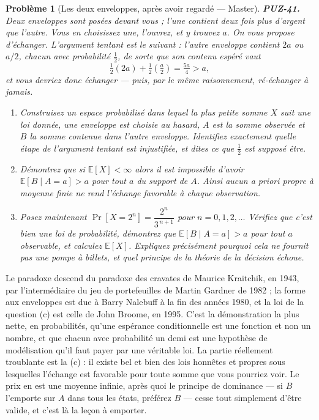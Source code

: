 \documentclass[11pt]{article}
\newtheorem{problem}{Problème}
\begin{document}
\begin{problem}[{Les deux enveloppes, après avoir regardé --- Master}]
\textbf{PUZ-41.} Deux enveloppes sont posées devant vous ; l'une contient deux fois plus
d'argent que l'autre. Vous en choisissez une, l'ouvrez, et y trouvez $ a $. On vous propose
d'échanger. L'argument tentant est le suivant : l'autre enveloppe contient $ 2a $ ou
$ a/2 $, chacun avec probabilité $ \tfrac{1}{2} $, de sorte que son contenu espéré vaut
\[ \tfrac{1}{2}(2a) + \tfrac{1}{2}\!\left(\tfrac{a}{2}\right) = \tfrac{5a}{4} > a, \]
et vous devriez donc échanger --- puis, par le même raisonnement, ré-échanger à jamais.
\begin{enumerate}
\item[(a)] Construisez un espace probabilisé dans lequel la plus petite somme $ X $ suit une loi
donnée, une enveloppe est choisie au hasard, $ A $ est la somme observée et $ B $ la
somme contenue dans l'autre enveloppe. Identifiez exactement quelle étape de l'argument
tentant est injustifiée, et dites ce que $ \tfrac{1}{2} $ est supposé être.
\item[(b)] Démontrez que si $ \mathbb{E}[X] < \infty $ alors il est impossible d'avoir
$ \mathbb{E}[B \mid A = a] > a $ pour tout $ a $ du support de $ A $. Ainsi aucun a
priori propre à moyenne finie ne rend l'échange favorable à chaque observation.
\item[(c)] Posez maintenant $ \Pr[X = 2^{n}] = \dfrac{2^{n}}{3^{\,n+1}} $ pour
$ n = 0, 1, 2, \ldots $ Vérifiez que c'est bien une loi de probabilité, démontrez que
$ \mathbb{E}[B \mid A = a] > a $ pour tout $ a $ observable, et calculez
$ \mathbb{E}[X] $. Expliquez précisément pourquoi cela ne fournit pas une pompe à billets,
et quel principe de la théorie de la décision échoue.
\end{enumerate}

\end{problem}

\noindent Le paradoxe descend du paradoxe des cravates de Maurice Kraitchik, en
1943, par l'intermédiaire du jeu de portefeuilles de Martin Gardner de 1982 ; la forme aux
enveloppes est due à Barry Nalebuff à la fin des années 1980, et la loi de la question (c)
est celle de John Broome, en 1995. C'est la démonstration la plus nette, en probabilités,
qu'une espérance conditionnelle est une fonction et non un nombre, et que \og{} chacun avec
probabilité un demi \fg{} est une hypothèse de modélisation qu'il faut payer par une véritable
loi. La partie réellement troublante est la (c) : il existe bel et bien des lois honnêtes et
propres sous lesquelles l'échange est favorable pour toute somme que vous pourriez voir. Le
prix en est une moyenne infinie, après quoi le principe de dominance --- si $ B $ l'emporte
sur $ A $ dans tous les états, préférez $ B $ --- cesse tout simplement d'être valide, et
c'est là la leçon à emporter.
\end{document}

